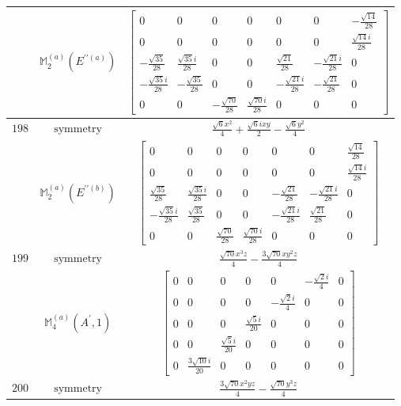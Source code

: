 \documentclass[fleqn,8pt,landscape]{jsarticle}
\begin{document}
\begin{longtable}{ccc}
$  $ & $ \mathbb{M}_{2}^{(a)}(E^{\prime\prime(a)}) $ & $ \begin{bmatrix} 0 & 0 & 0 & 0 & 0 & 0 & - \frac{\sqrt{14}}{28} \\ 0 & 0 & 0 & 0 & 0 & 0 & \frac{\sqrt{14} i}{28} \\ - \frac{\sqrt{35}}{28} & \frac{\sqrt{35} i}{28} & 0 & 0 & \frac{\sqrt{21}}{28} & - \frac{\sqrt{21} i}{28} & 0 \\ - \frac{\sqrt{35} i}{28} & - \frac{\sqrt{35}}{28} & 0 & 0 & - \frac{\sqrt{21} i}{28} & - \frac{\sqrt{21}}{28} & 0 \\ 0 & 0 & - \frac{\sqrt{70}}{28} & \frac{\sqrt{70} i}{28} & 0 & 0 & 0 \end{bmatrix} $ \\ \hline
$ 198 $ & $ \text{symmetry} $ & $ \frac{\sqrt{6} x^{2}}{4} + \frac{\sqrt{6} i x y}{2} - \frac{\sqrt{6} y^{2}}{4} $ \\
$  $ & $ \mathbb{M}_{2}^{(a)}(E^{\prime\prime(b)}) $ & $ \begin{bmatrix} 0 & 0 & 0 & 0 & 0 & 0 & \frac{\sqrt{14}}{28} \\ 0 & 0 & 0 & 0 & 0 & 0 & \frac{\sqrt{14} i}{28} \\ \frac{\sqrt{35}}{28} & \frac{\sqrt{35} i}{28} & 0 & 0 & - \frac{\sqrt{21}}{28} & - \frac{\sqrt{21} i}{28} & 0 \\ - \frac{\sqrt{35} i}{28} & \frac{\sqrt{35}}{28} & 0 & 0 & - \frac{\sqrt{21} i}{28} & \frac{\sqrt{21}}{28} & 0 \\ 0 & 0 & \frac{\sqrt{70}}{28} & \frac{\sqrt{70} i}{28} & 0 & 0 & 0 \end{bmatrix} $ \\ \hline
$ 199 $ & $ \text{symmetry} $ & $ \frac{\sqrt{70} x^{3} z}{4} - \frac{3 \sqrt{70} x y^{2} z}{4} $ \\
$  $ & $ \mathbb{M}_{4}^{(a)}(A^{\prime},1) $ & $ \begin{bmatrix} 0 & 0 & 0 & 0 & 0 & - \frac{\sqrt{2} i}{4} & 0 \\ 0 & 0 & 0 & 0 & - \frac{\sqrt{2} i}{4} & 0 & 0 \\ 0 & 0 & 0 & \frac{\sqrt{5} i}{20} & 0 & 0 & 0 \\ 0 & 0 & \frac{\sqrt{5} i}{20} & 0 & 0 & 0 & 0 \\ 0 & \frac{3 \sqrt{10} i}{20} & 0 & 0 & 0 & 0 & 0 \end{bmatrix} $ \\ \hline
$ 200 $ & $ \text{symmetry} $ & $ \frac{3 \sqrt{70} x^{2} y z}{4} - \frac{\sqrt{70} y^{3} z}{4} $ \\

\end{longtable}
\end{document}
